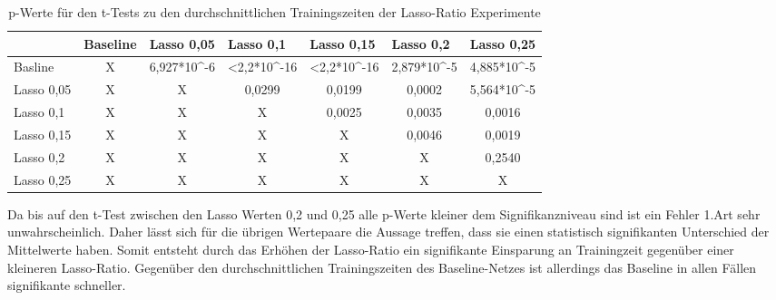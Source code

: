 \begin{table}[]
\caption{p-Werte für den t-Tests zu den durchschnittlichen Trainingszeiten der Lasso-Ratio Experimente }
\begin{tabular}{l|c|c|c|c|c|c|}
\cline{2-7}
                                 & \multicolumn{1}{l|}{Baseline} & \multicolumn{1}{l|}{Lasso 0,05} & \multicolumn{1}{l|}{Lasso 0,1} & \multicolumn{1}{l|}{Lasso 0,15} & \multicolumn{1}{l|}{Lasso 0,2} & \multicolumn{1}{l|}{Lasso 0,25} \\ \hline
\multicolumn{1}{|l|}{Basline}    & X                             & 6,927*10\textasciicircum{}-6    & <2,2*10\textasciicircum{}-16    & <2,2*10\textasciicircum{}-16     & 2,879*10\textasciicircum{}-5   & 4,885*10\textasciicircum{}-5    \\ \hline
\multicolumn{1}{|l|}{Lasso 0,05} & X                             & X                               & 0,0299                         & 0,0199                          & 0,0002                         & 5,564*10\textasciicircum{}-5    \\ \hline
\multicolumn{1}{|l|}{Lasso 0,1}  & X                             & X                               & X                              & 0,0025                          & 0,0035                         & 0,0016                          \\ \hline
\multicolumn{1}{|l|}{Lasso 0,15} & X                             & X                               & X                              & X                               & 0,0046                         & 0,0019                          \\ \hline
\multicolumn{1}{|l|}{Lasso 0,2}  & X                             & X                               & X                              & X                               & X                              & \cellcolor[HTML]{FE0000}0,2540                          \\ \hline
\multicolumn{1}{|l|}{Lasso 0,25} & X                             & X                               & X                              & X                               & X                              & X                               \\ \hline
\end{tabular}
\end{table}
Da bis auf den t-Test zwischen den Lasso Werten 0,2 und 0,25 alle p-Werte kleiner dem Signifikanzniveau sind ist ein Fehler 1.Art sehr unwahrscheinlich. Daher lässt sich für die übrigen Wertepaare die Aussage treffen, dass sie einen statistisch signifikanten Unterschied der Mittelwerte haben. Somit entsteht durch das Erhöhen der Lasso-Ratio ein signifikante Einsparung an Trainingzeit gegenüber einer kleineren Lasso-Ratio. Gegenüber den durchschnittlichen Trainingszeiten des Baseline-Netzes ist allerdings das Baseline in allen Fällen signifikante schneller.  


